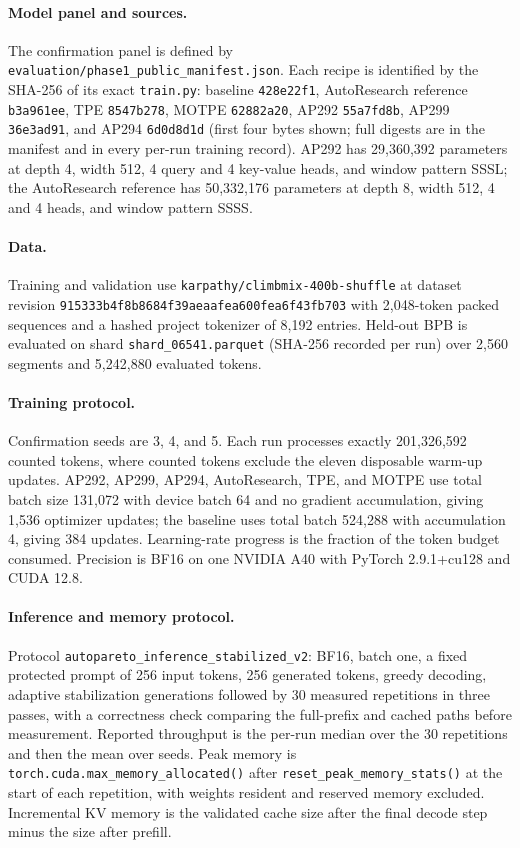 \documentclass{article}
\begin{document}
\paragraph{Model panel and sources.} The confirmation panel is defined by \texttt{evaluation/phase1\_public\_manifest.json}. Each recipe is identified by the SHA-256 of its exact \texttt{train.py}: baseline \texttt{428e22f1}, AutoResearch reference \texttt{b3a961ee}, TPE \texttt{8547b278}, MOTPE \texttt{62882a20}, AP292 \texttt{55a7fd8b}, AP299 \texttt{36e3ad91}, and AP294 \texttt{6d0d8d1d} (first four bytes shown; full digests are in the manifest and in every per-run training record). AP292 has 29,360,392 parameters at depth 4, width 512, 4 query and 4 key-value heads, and window pattern SSSL; the AutoResearch reference has 50,332,176 parameters at depth 8, width 512, 4 and 4 heads, and window pattern SSSS.

\paragraph{Data.} Training and validation use \texttt{karpathy/climbmix-400b-shuffle} at dataset revision \texttt{915333b4f8b8684f39aeaafea600fea6f43fb703} with 2,048-token packed sequences and a hashed project tokenizer of 8,192 entries. Held-out BPB is evaluated on shard \texttt{shard\_06541.parquet} (SHA-256 recorded per run) over 2,560 segments and 5,242,880 evaluated tokens.

\paragraph{Training protocol.} Confirmation seeds are 3, 4, and 5. Each run processes exactly 201,326,592 counted tokens, where counted tokens exclude the eleven disposable warm-up updates. AP292, AP299, AP294, AutoResearch, TPE, and MOTPE use total batch size 131,072 with device batch 64 and no gradient accumulation, giving 1,536 optimizer updates; the baseline uses total batch 524,288 with accumulation 4, giving 384 updates. Learning-rate progress is the fraction of the token budget consumed. Precision is BF16 on one NVIDIA A40 with PyTorch 2.9.1+cu128 and CUDA 12.8.

\paragraph{Inference and memory protocol.} Protocol \texttt{autopareto\_inference\_stabilized\_v2}: BF16, batch one, a fixed protected prompt of 256 input tokens, 256 generated tokens, greedy decoding, adaptive stabilization generations followed by 30 measured repetitions in three passes, with a correctness check comparing the full-prefix and cached paths before measurement. Reported throughput is the per-run median over the 30 repetitions and then the mean over seeds. Peak memory is \texttt{torch.cuda.max\_memory\_allocated()} after \texttt{reset\_peak\_memory\_stats()} at the start of each repetition, with weights resident and reserved memory excluded. Incremental KV memory is the validated cache size after the final decode step minus the size after prefill.
\end{document}
